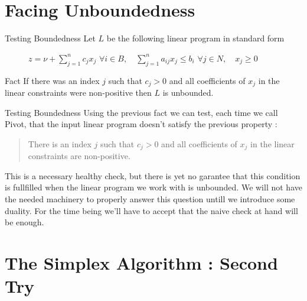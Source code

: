 \documentclass[32pt, aspectratio = 169]{beamer}
\begin{document}
\section{Facing Unboundedness}

\begin{frame}{Testing Boundedness}
    Let $L$ be the following linear program in standard form
    \begin{figure}
        \begin{linearProgG}{
            ${\displaystyle z = \nu + \sum_{j=1}^n c_jx_j}$
            }{
            ${\displaystyle \forall i \in B, \quad \sum_{j=1}^n a_{ij}x_j \leq b_i}$
            }{
            $\forall j \in N, \quad x_j \geq 0$
            }
        \end{linearProgG}
    \end{figure}
    \pause
    \begin{halfshyblock}{Fact}
        If there was an index $j$ such that $c_j > 0$ and all coefficients of $x_{j}$ in the linear constraints were non-positive then $L$ is unbounded.
    \end{halfshyblock}
\end{frame}

\begin{frame}{Testing Boundedness}
    Using the previous fact we can test, each time we call Pivot, that the input linear program \alert{doesn't} satisfy the previous property :
    \begin{quote}
      There is an index $j$ such that $c_j > 0$ and all coefficients of $x_j$ in the linear constraints are non-positive.
    \end{quote}

    This is a necessary healthy check, but there is yet no garantee that this condition is fullfilled when the linear program we work with is unbounded. We will not have the needed machinery to properly answer this question untill we introduce some duality. For the time being we'll have to accept that the naive check at hand will be enough.
\end{frame}

\section{The Simplex Algorithm : Second Try}
\end{document}
